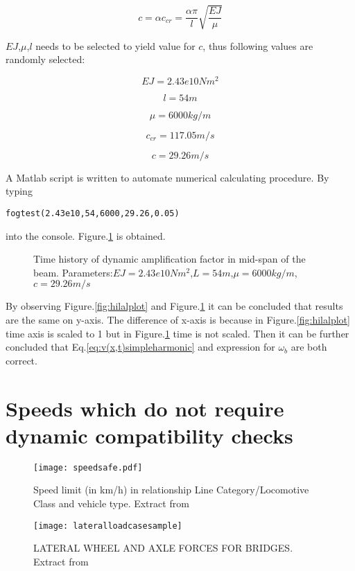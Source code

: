 \begin{appendices}
$$c = \alpha c_{cr} = \frac{\alpha\pi}{l}\sqrt{\frac{EJ}{\mu}}$$

$EJ$,$\mu$,$l$ needs to be selected to yield value for $c$, thus following values are randomly selected:

$$EJ = 2.43e10 Nm^2$$

$$l = 54m$$

$$\mu = 6000 kg/m$$

$$c_{cr} = 117.05 m/s$$

$$ c = 29.26 m/s $$

A Matlab script is written to automate numerical calculating procedure. By typing 

\texttt{fogtest(2.43e10,54,6000,29.26,0.05)}

into the console. Figure.\ref{fig:EJ24300000000L54mu6000c29daf.tikz} is obtained.

\begin{figure}[h!]
\centering 
\setlength\figureheight{6cm} 
\setlength\figurewidth{6cm} 
 
\caption{Time history of dynamic amplification factor in mid-span of the beam. Parameters:$EJ=2.43e10Nm^2$,$L=54m$,$\mu=6000kg/m$,$c=29.26m/s$} 
\label{fig:EJ24300000000L54mu6000c29daf.tikz} 
\end{figure}

By observing Figure.\ref{fig:hilalplot} and Figure.\ref{fig:EJ24300000000L54mu6000c29daf.tikz} it can be concluded that results are the same on y-axis. The difference of x-axis is because in Figure.\ref{fig:hilalplot} time axis is scaled to 1 but in Figure.\ref{fig:EJ24300000000L54mu6000c29daf.tikz} time is not scaled. Then it can be further concluded that Eq.\ref{eq:v(x,t)simpleharmonic} and expression for $\omega_b$ are both correct.


\chapter{Speeds which do not require dynamic compatibility checks} \label{app:speedsafe}

\begin{figure}[h]
    \centering
    \texttt{[image: speedsafe.pdf]}
    \caption{Speed limit (in km/h) in relationship Line Category/Locomotive Class and vehicle type. Extract from \citet[Appendix F]{EC15528}}
\end{figure}


\begin{figure}[h]
    \centering
    \texttt{[image: lateralloadcasesample]}
    \caption{LATERAL WHEEL AND AXLE FORCES FOR BRIDGES. Extract from \citet[Fig 3.1]{d181}}
    \label{fig:lateralloadcasesample}
\end{figure}


\end{appendices}
